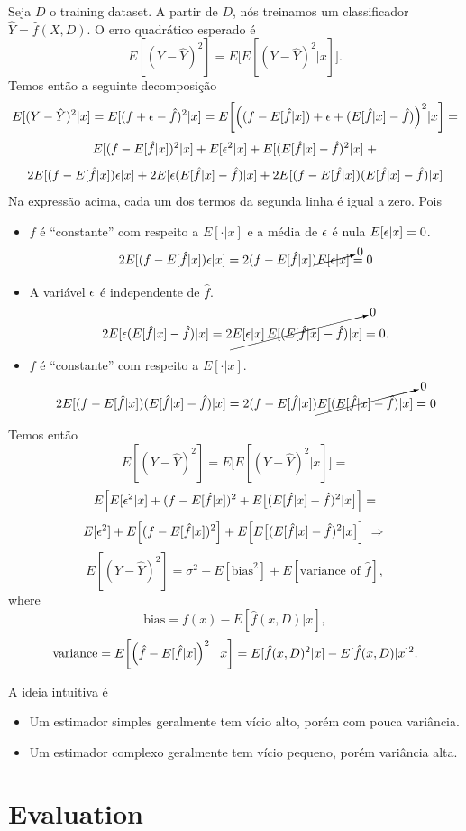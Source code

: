 \documentclass[a4paper,fleqn,12pt]{article}
\begin{document}
Seja $D$ o training dataset. A partir de $D$, nós treinamos um classificador $\hat{Y} = \hat{f}(X, D)$. O erro quadrático esperado é
$$
E[(Y-\hat{Y})^2] = E\Big[E[(Y-\hat{Y})^2 | x]\Big].
$$
Temos então a seguinte decomposição
$$
E[(Y-\hat{Y})^2 | x] = E[(f + \epsilon - \hat{f} )^2 | x] = E\qty[\Big((f - E[\hat{f}|x]) + \epsilon + (E[\hat{f}|x] - \hat{f}) \Big)^2 | x] =
$$
$$
E[(f-E[\hat{f}|x])^2|x] + E[\epsilon^2|x] + E[(E[\hat{f}|x]-\hat{f})^2|x] \; +
$$
$$
2E[(f-E[\hat{f}|x]) \epsilon|x] + 2E[\epsilon (E[\hat{f}|x] - \hat{f})|x] +
2E[(f-E[\hat{f}|x]) (E[\hat{f}|x] - \hat{f})|x]
$$
Na expressão acima, cada um dos termos da segunda linha é igual a zero. Pois
\begin{itemize}
\item $f$ é ``constante'' com respeito a $E[\cdot | x]$ e a média de $\epsilon$ é nula $E[\epsilon | x] = 0$.
$$
2E[(f-E[\hat{f}|x]) \epsilon|x] = 2 (f-E[\hat{f}|x]) \cancelto{0}{E[\epsilon|x]} = 0
$$
\item A variável $\epsilon$ é independente de $\hat{f}$.
$$
2E[\epsilon (E[\hat{f}|x] - \hat{f})|x] = 2 \cancelto{0}{E[\epsilon|x] \, E[(E[\hat{f}|x] - \hat{f})|x]} = 0.
$$
\item $f$ é ``constante'' com respeito a $E[\cdot | x]$.
$$
2E[(f-E[\hat{f}|x]) (E[\hat{f}|x] - \hat{f})|x] = 2 (f-E[\hat{f}|x])
\cancelto{0}{E[(E[\hat{f}|x] - \hat{f})|x]} = 0
$$
\end{itemize}
Temos então
$$
E[(Y-\hat{Y})^2] = E\Big[E[(Y-\hat{Y})^2 | x]\Big] =
$$
$$
E\Big[E[\epsilon^2|x] + (f-E[\hat{f}|x])^2 + E\big[(E[\hat{f}|x]-\hat{f})^2|x\big]\Big]=
$$
$$
E[\epsilon^2] + E\Big[(f-E[\hat{f}|x])^2\Big] + E\Big[E\big[(E[\hat{f}|x]-\hat{f})^2|x\big]\Big] \; \Rightarrow \;
$$
$$
\boxed{E[(Y-\hat{Y})^2] = \sigma^2 + E[\text{bias}^2] + E[\text{variance of }\hat{f}],}
$$
where
$$
\text{bias} = f(x) - E[\hat{f}(x, D) | x],
$$
$$
\text{variance} = E\qty[\Big(\hat{f}-E[\hat{f}|x]\Big)^2\mid x] = E[\hat{f}(x, D)^2 | x] - E[\hat{f}(x, D) | x]^2.
$$

A ideia intuitiva é
\begin{itemize}
\item Um estimador simples geralmente tem vício alto, porém com pouca variância.
\item Um estimador complexo geralmente tem vício pequeno, porém variância alta.
\end{itemize}

\section{Evaluation}
\end{document}
